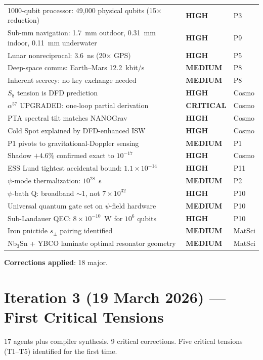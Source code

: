 \documentclass[11pt,a4paper]{article}
\newcommand{\CRITICAL}{\textcolor{critical}{\textbf{CRITICAL}}}
\newcommand{\HIGH}{\textcolor{high}{\textbf{HIGH}}}
\newcommand{\MEDIUM}{\textcolor{medium}{\textbf{MEDIUM}}}
\begin{document}
\begin{longtable}{p{}p{}p{}}
1000-qubit processor: 49,000 physical qubits (15$\times$ reduction) & \HIGH & P3 \\
Sub-mm navigation: 1.7~mm outdoor, 0.31~mm indoor, 0.11~mm underwater & \HIGH & P9 \\
Lunar nonreciprocal: 3.6~ns (20$\times$ GPS) & \HIGH & P5 \\
Deep-space comms: Earth--Mars 12.2~kbit/s & \MEDIUM & P8 \\
Inherent secrecy: no key exchange needed & \MEDIUM & P8 \\
$S_8$ tension is DFD prediction & \HIGH & Cosmo \\
$\alpha^{57}$ UPGRADED: one-loop partial derivation & \CRITICAL & Cosmo \\
PTA spectral tilt matches NANOGrav & \HIGH & Cosmo \\
Cold Spot explained by DFD-enhanced ISW & \HIGH & Cosmo \\
P1 pivots to gravitational-Doppler sensing & \MEDIUM & P1 \\
Shadow $+4.6\%$ confirmed exact to $10^{-17}$ & \HIGH & Cosmo \\
ESS Lund tightest accidental bound: $1.1\times10^{-14}$ & \HIGH & P11 \\
$\psi$-mode thermalization: $10^{28}$~s & \MEDIUM & P2 \\
$\psi$-bath Q: broadband $\sim$1, not $7\times10^{32}$ & \HIGH & P10 \\
Universal quantum gate set on $\psi$-field hardware & \MEDIUM & P10 \\
Sub-Landauer QEC: $8\times10^{-10}$~W for $10^6$ qubits & \HIGH & P10 \\
Iron pnictide $s_\pm$ pairing identified & \MEDIUM & MatSci \\
Nb$_3$Sn + YBCO laminate optimal resonator geometry & \MEDIUM & MatSci \\
\bottomrule
\end{longtable}

\noindent\textbf{Corrections applied}: 18 major.


\section{Iteration 3 (19 March 2026) --- First Critical Tensions}

17 agents plus compiler synthesis.  9 critical corrections.  Five critical
tensions (T1--T5) identified for the first time.
\end{document}

